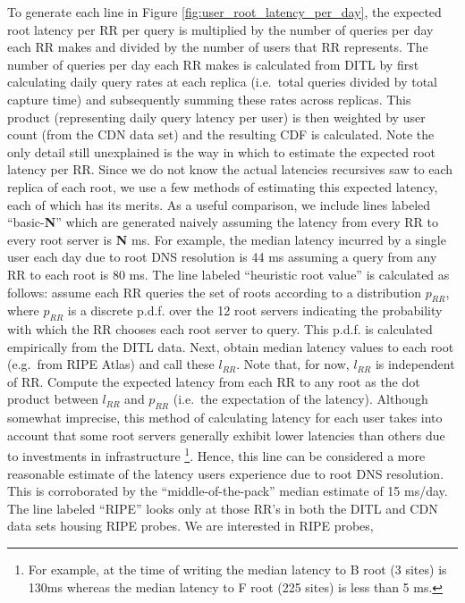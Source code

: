 \documentclass[sigconf,nonacm,10pt]{acmart}
\begin{document}
To generate each line in Figure \ref{fig:user_root_latency_per_day}, the
expected root latency per RR per query is multiplied by the number of
queries per day each RR makes and divided by the number of users that RR
represents. The number of queries per day each RR makes is calculated
from DITL by first calculating daily query rates at each replica
(i.e.~total queries divided by total capture time) and subsequently
summing these rates across replicas. This product (representing daily
query latency per user) is then weighted by user count (from the CDN
data set) and the resulting CDF is calculated. Note the only detail
still unexplained is the way in which to estimate the expected root
latency per RR. \break \break
Since we do not know the actual latencies recursives saw to each replica
of each root, we use a few methods of estimating this expected latency,
each of which has its merits. As a useful comparison, we include lines
labeled ``basic-\textbf{N}'' which are generated naively assuming the
latency from every RR to every root server is \textbf{N} ms. For
example, the median latency incurred by a single user each day due to
root DNS resolution is 44 ms assuming a query from any RR to each root
is 80 ms. \break \break
The line labeled ``heuristic root value'' is calculated as follows:
assume each RR queries the set of roots according to a distribution
\(p_{RR}\), where \(p_{RR}\) is a discrete p.d.f. over the 12 root
servers indicating the probability with which the RR chooses each root
server to query. This p.d.f. is calculated empirically from the DITL
data. Next, obtain median latency values to each root (e.g.~from RIPE
Atlas) and call these \(l_{RR}\). Note that, for now, \(l_{RR}\) is
independent of RR. Compute the expected latency from each RR to any root
as the dot product between \(l_{RR}\) and \(p_{RR}\) (i.e.~the
expectation of the latency). Although somewhat imprecise, this method of
calculating latency for each user takes into account that some root
servers generally exhibit lower latencies than others due to investments
in infrastructure
\footnote{ For example, at the time of writing the median latency to B root (3 sites) is 130ms whereas the median latency to F root  (225 sites) is less than 5 ms. }.
Hence, this line can be considered a more reasonable estimate of the
latency users experience due to root DNS resolution. This is
corroborated by the ``middle-of-the-pack'' median estimate of 15 ms/day.
\break \break
The line labeled ``RIPE'' looks only at those RR's in both the DITL and
CDN data sets housing RIPE probes. We are interested in RIPE probes,
\end{document}
